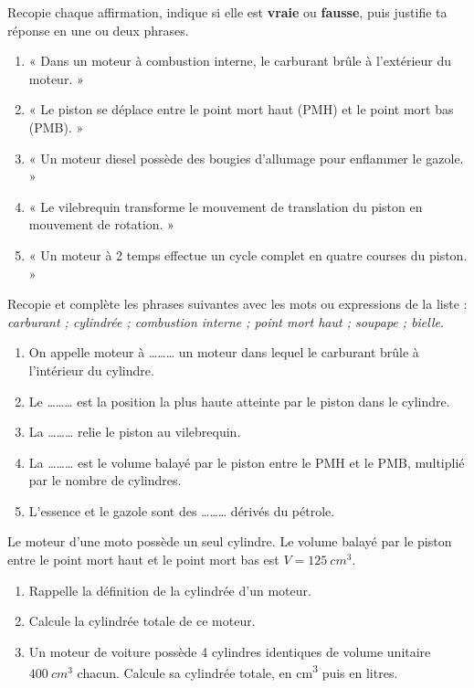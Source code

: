 \documentclass[11pt]{article}
\begin{document}
\begin{exercice}
Recopie chaque affirmation, indique si elle est \textbf{vraie} ou \textbf{fausse}, puis justifie ta réponse en une ou deux phrases.
\begin{enumerate}
\item « Dans un moteur à combustion interne, le carburant brûle à l'extérieur du moteur. »
\item « Le piston se déplace entre le point mort haut (PMH) et le point mort bas (PMB). »
\item « Un moteur diesel possède des bougies d'allumage pour enflammer le gazole. »
\item « Le vilebrequin transforme le mouvement de translation du piston en mouvement de rotation. »
\item « Un moteur à 2 temps effectue un cycle complet en quatre courses du piston. »
\end{enumerate}
\end{exercice}

\begin{exercice}
Recopie et complète les phrases suivantes avec les mots ou expressions de la liste : \emph{carburant ; cylindrée ; combustion interne ; point mort haut ; soupape ; bielle}.
\begin{enumerate}
\item On appelle moteur à \ldots\ldots\ldots{} un moteur dans lequel le carburant brûle à l'intérieur du cylindre.
\item Le \ldots\ldots\ldots{} est la position la plus haute atteinte par le piston dans le cylindre.
\item La \ldots\ldots\ldots{} relie le piston au vilebrequin.
\item La \ldots\ldots\ldots{} est le volume balayé par le piston entre le PMH et le PMB, multiplié par le nombre de cylindres.
\item L'essence et le gazole sont des \ldots\ldots\ldots{} dérivés du pétrole.
\end{enumerate}
\end{exercice}

\begin{exercice}
Le moteur d'une moto possède un seul cylindre. Le volume balayé par le piston entre le point mort haut et le point mort bas est $V = \SI{125}{cm^3}$.
\begin{enumerate}
\item Rappelle la définition de la cylindrée d'un moteur.
\item Calcule la cylindrée totale de ce moteur.
\item Un moteur de voiture possède 4 cylindres identiques de volume unitaire $\SI{400}{cm^3}$ chacun. Calcule sa cylindrée totale, en \si{cm^3} puis en litres.
\end{enumerate}
\end{exercice}
\end{document}
